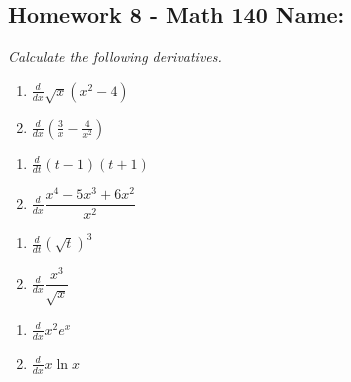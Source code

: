 \documentclass[10pt]{article}
\newcommand{\ds}{\displaystyle}
\begin{document}
\pagestyle{empty}
\subsection*{Homework 8 - Math 140 \hfill Name: \underline{\hspace*{2in}}}

\noindent
\textit{Calculate the following derivatives.  }


\begin{multicols}{2}
\begin{enumerate}
\item $\ds \frac{d}{dx} \sqrt{x}(x^2 - 4)$
\item $\ds \frac{d}{dx} \left(\frac{3}{x} - \frac{4}{x^2}\right)$
\setcounter{enumCount}{\theenumi}
\end{enumerate}
\end{multicols}
\vfill

\begin{multicols}{2}
\begin{enumerate}
\setcounter{enumi}{\theenumCount}
\item $\ds \frac{d}{dt} (t-1)(t+1)$
\item $\ds \frac{d}{dx} \dfrac{x^4 - 5x^3 + 6x^2}{x^2}$
\setcounter{enumCount}{\theenumi}
\end{enumerate}
\end{multicols}
\vfill

\begin{multicols}{2}
\begin{enumerate}
\setcounter{enumi}{\theenumCount}
\item $\ds \frac{d}{dt} (\sqrt{t})^3$
\item $\ds \frac{d}{dx} \dfrac{x^3}{\sqrt{x}}$
\setcounter{enumCount}{\theenumi}
\end{enumerate}
\end{multicols}
\vfill


\begin{multicols}{2}
\begin{enumerate}
\setcounter{enumi}{\theenumCount}
\item $\ds \frac{d}{dx} x^2 e^x$
\item $\ds \frac{d}{dx} x \ln x$
\setcounter{enumCount}{\theenumi}
\end{enumerate}
\end{multicols}
\vfill
\end{document}
